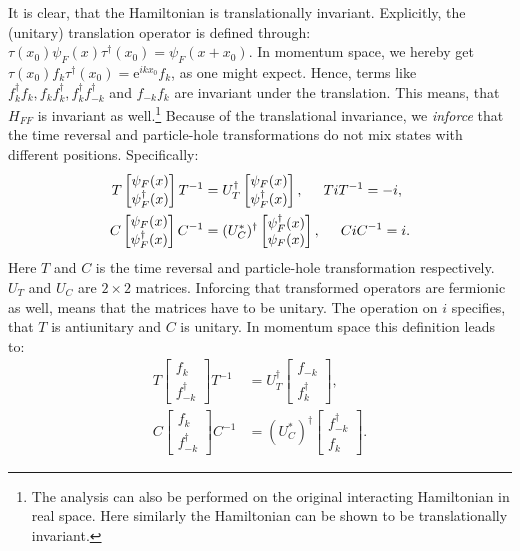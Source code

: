 It is clear, that the Hamiltonian is translationally invariant. Explicitly, the (unitary) translation operator is defined through: $\tau(x_0)\psi_F(x)\tau^\dagger (x_0) = \psi_F(x+x_0)$. In momentum space, we hereby get $\tau(x_0) f_k \tau^\dagger(x_0) = \text{e}^{ikx_0}f_k$, as one might expect. Hence, terms like $f^\dagger_k f_k, f_k f^\dagger_k, f^\dagger_kf^\dagger_{-k}$ and $f_{-k}f_k$ are invariant under the translation. This means, that $H_{FF}$ is invariant as well.\footnote{The analysis can also be performed on the original interacting Hamiltonian in real space. Here similarly the Hamiltonian can be shown to be translationally invariant.} Because of the translational invariance, we \textit{inforce} that the time reversal and particle-hole transformations do not mix states with different positions. Specifically:
\begin{align}
T \begin{bmatrix} \psi_F(x) \\ \psi^\dagger_F(x) \end{bmatrix} T^{-1} &= U^\dagger_T \begin{bmatrix} \psi_F(x) \\ \psi^\dagger_F(x) \end{bmatrix}, \hspace{0.5cm} TiT^{-1} = -i, \nonumber \\
C \begin{bmatrix} \psi_F(x) \\ \psi^\dagger_F(x) \end{bmatrix} C^{-1} &= (U^*_C)^\dagger \begin{bmatrix} \psi^\dagger_F(x) \\ \psi_F(x) \end{bmatrix}, \hspace{0.5cm} CiC^{-1} = i.  
\label{eq.TRandPH.realspace}
\end{align}
Here $T$ and $C$ is the time reversal and particle-hole transformation respectively. $U_T$ and $U_C$ are $2\times 2$ matrices. Inforcing that transformed operators are fermionic as well, means that the matrices have to be unitary. The operation on $i$ specifies, that $T$ is antiunitary and $C$ is unitary. In momentum space this definition leads to:
\begin{align}
T \begin{bmatrix} f_k \\ f^\dagger_{-k} \end{bmatrix} T^{-1} &= U^\dagger_T \begin{bmatrix} f_{-k} \\ f^\dagger_{k} \end{bmatrix}, \nonumber \\
C \begin{bmatrix} f_k \\ f^\dagger_{-k} \end{bmatrix} C^{-1} &= (U^*_C)^\dagger \begin{bmatrix} f^\dagger_{-k} \\ f_{k} \end{bmatrix}. 
\label{eq.TRandPH.momentumspace}
\end{align}
